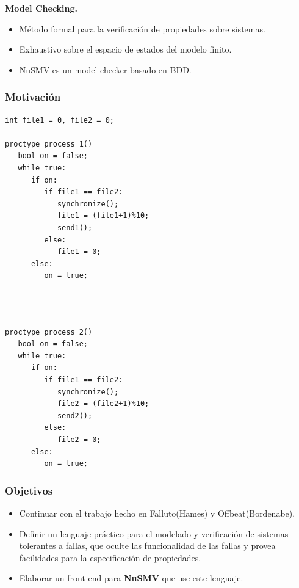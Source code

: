 \documentclass[serif]{beamer}
\begin{document}
\begin{frame}
{\Large \bfseries Model Checking.}
\begin{itemize}\itemsep15pt
\item Método formal para la verificación de propiedades sobre sistemas.
\item Exhaustivo sobre el espacio de estados del modelo finito.
\item NuSMV es un model checker basado en BDD.
\end{itemize}
\end{frame}


\begin{frame}[fragile]
\frametitle{Motivación}
{\fontsize{9pt}{13pt}\selectfont
\begin{minipage}{0.5\textwidth}
\begin{verbatim}
int file1 = 0, file2 = 0;

proctype process_1()
   bool on = false;
   while true:
      if on:
         if file1 == file2:
            synchronize();
            file1 = (file1+1)%10;
            send1();
         else:
            file1 = 0;
      else:
         on = true;
\end{verbatim}
\end{minipage}
\begin{minipage}{0.48\textwidth}
\begin{verbatim}



proctype process_2()
   bool on = false;
   while true:
      if on:
         if file1 == file2:
            synchronize();
            file2 = (file2+1)%10;
            send2();
         else:
            file2 = 0;
      else:
         on = true;
\end{verbatim}
\end{minipage}
} %
\end{frame}

\begin{frame}
\frametitle{Objetivos}
\begin{itemize}\itemsep15pt
\item Continuar con el trabajo hecho en Falluto(Hames) y Offbeat(Bordenabe). 
\item Definir un lenguaje práctico para el modelado y verificación de 
sistemas tolerantes a fallas, que oculte las funcionalidad de las 
fallas y provea facilidades para la especificación de propiedades.
\item Elaborar un front-end para \textbf{NuSMV} que use este lenguaje.
\end{itemize}
\end{frame}
\end{document}
